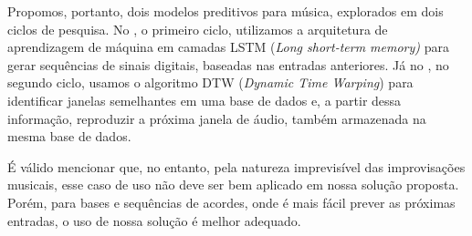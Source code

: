 Propomos, portanto, dois modelos preditivos para música, explorados em dois ciclos de pesquisa. No , o primeiro ciclo, utilizamos a arquitetura de aprendizagem de máquina em camadas LSTM (\textit{Long short-term memory)} \cite{lstm} para gerar sequências de sinais digitais, baseadas nas entradas anteriores. Já no , no segundo ciclo, usamos o algoritmo DTW (\textit{Dynamic Time Warping}) \cite{dtw} para identificar janelas semelhantes em uma base de dados e, a partir dessa informação, reproduzir a próxima janela de áudio, também armazenada na mesma base de dados.

É válido mencionar que, no entanto, pela natureza imprevisível das improvisações musicais, esse caso de uso não deve ser bem aplicado em nossa solução proposta. Porém, para bases e sequências de acordes, onde é mais fácil prever as próximas entradas, o uso de nossa solução é melhor adequado.
